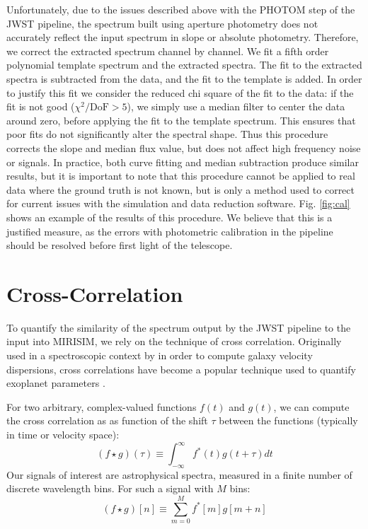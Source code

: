 Unfortunately, due to the issues described above with the PHOTOM step of the JWST pipeline, the spectrum built using aperture photometry does not accurately reflect the input spectrum in slope or absolute photometry. 
Therefore, we correct the extracted spectrum channel by channel. 
We fit a fifth order polynomial template spectrum and the extracted spectra.
The fit to the extracted spectra is subtracted from the data, and the fit to the template is added. 
In order to justify this fit we consider the reduced chi square of the fit to the data: if the fit is not good ($\chi^{2}/\mathrm{DoF} > 5$), we simply use a median filter to center the data around zero, before applying the fit to the template spectrum.
This ensures that poor fits do not significantly alter the spectral shape. 
Thus this procedure corrects the slope and median flux value, but does not affect high frequency noise or signals.
In practice, both curve fitting and median subtraction produce similar results, but it is important to note that this procedure cannot be applied to real data where the ground truth is not known, but is only a method used to correct for current issues with the simulation and data reduction software.
Fig. \ref{fig:cal} shows an example of the results of this procedure. 
We believe that this is a justified measure, as the errors with photometric calibration in the pipeline should be resolved before first light of the telescope.

\section{Cross-Correlation}\label{sec:cc}
To quantify the similarity of the spectrum output by the JWST pipeline to the input into MIRISIM, we rely on the technique of cross correlation.
Originally used in a spectroscopic context by \parencite{Simkin1974} in order to compute galaxy velocity dispersions, cross correlations have become a popular technique used to quantify exoplanet parameters \parencite{Snellen2014}.

For two arbitrary, complex-valued functions $f(t)$ and $g(t)$, we can compute the cross correlation as as function of the shift $\tau$ between the functions (typically in time or velocity space):
\begin{equation}\label{eqn:crosscorr}
\left(f \star g\right)(\tau) \equiv \int_{-\infty}^{\infty}f^{*}(t)g(t + \tau)dt
\end{equation}
Our signals of interest are astrophysical spectra, measured in a finite number of discrete wavelength bins. For such a signal with $M$ bins:
\begin{equation}\label{eqn:discretecorr}
\left(f \star g\right)[n] \equiv \sum_{m=0}^{M}f^{*}[m]g[m + n]
\end{equation}

